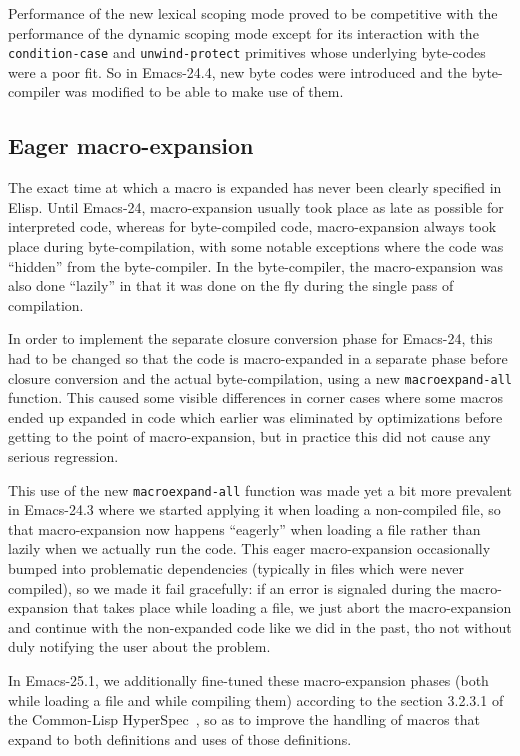 \documentclass[format=acmsmall, review=false, screen=true]{acmart}
\newcommand \Elisp {Elisp}
\begin{document}
Performance of the new lexical scoping mode proved to be competitive
with the performance of the dynamic scoping mode except for its interaction
with the \texttt{condition-case} and \texttt{unwind-protect} primitives
whose underlying byte-codes were a poor fit.  So in Emacs-24.4, new byte
codes were introduced and the byte-compiler was modified to be able to make
use of them.

\subsection{Eager macro-expansion} %

The exact time at which a macro is expanded has never been clearly specified
in \Elisp{}.  Until Emacs-24, macro-expansion usually took place as late as
possible for interpreted code, whereas for byte-compiled code,
macro-expansion always took place during byte-compilation, with some notable
exceptions where the code was ``hidden'' from the byte-compiler.  In the
byte-compiler, the macro-expansion was also done ``lazily'' in that it was
done on the fly during the single pass of compilation.

In order to implement the separate closure conversion phase for Emacs-24,
this had to be changed so that the code is macro-expanded in a separate
phase before closure conversion and the actual byte-compilation, using a new
\texttt{macroexpand-all} function.
This caused some visible differences in corner cases where some macros ended
up expanded in code which earlier was eliminated by optimizations before
getting to the point of macro-expansion, but in practice this did not cause
any serious regression.

This use of the new \texttt{macroexpand-all} function was made yet a bit
more prevalent in Emacs-24.3 where we started applying it when loading
a non-compiled file, so that macro-expansion now happens ``eagerly'' when
loading a file rather than lazily when we actually run the code.  This eager
macro-expansion occasionally bumped into problematic dependencies (typically
in files which were never compiled), so we made it fail gracefully: if an
error is signaled during the macro-expansion that takes place while loading
a file, we just abort the macro-expansion and continue with the non-expanded
code like we did in the past, tho not without duly notifying the user about
the problem.

In Emacs-25.1, we additionally fine-tuned these macro-expansion phases (both
while loading a file and while compiling them) according to the section
3.2.3.1 of the Common-Lisp HyperSpec~\cite{HyperSpec}, so as to improve the
handling of macros that expand to both definitions and uses of
those definitions.
\end{document}
